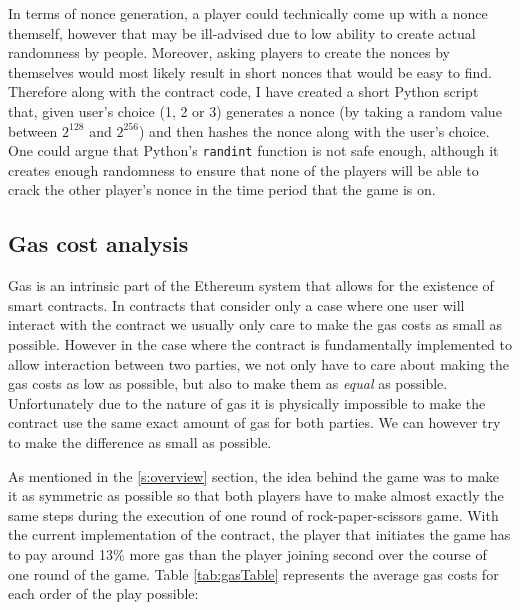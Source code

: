 \documentclass{article}
\begin{document}
    \noindent In terms of nonce generation, a player could
    technically come up with a nonce themself, however that
    may be ill-advised due to low ability to create actual
    randomness by people. Moreover, asking players to create
    the nonces by themselves would most likely result in
    short nonces that would be easy to find. Therefore along
    with the contract code, I have created a short Python
    script that, given user's choice (1, 2 or 3) generates a
    nonce (by taking a random value between \(2^{128}\) and
    \(2^{256}\)) and then hashes the nonce along with the
    user's choice. One could argue that Python's
    \verb|randint| function is not safe enough, although it
    creates enough randomness to ensure that none of the
    players will be able to crack the other player's nonce
    in the time period that the game is on.

    \subsection{Gas cost analysis}
    Gas is an intrinsic part of the Ethereum system that
    allows for the existence of smart contracts. In
    contracts that consider only a case where one user will
    interact with the contract we usually only care to make
    the gas costs as small as possible. However in the case
    where the contract is fundamentally implemented to allow
    interaction between two parties, we not only have to
    care about making the gas costs as low as possible, but
    also to make them as {\itshape equal} as possible.
    Unfortunately due to the nature of gas it is physically
    impossible to make the contract use the same exact
    amount of gas for both parties. We can however try to
    make the difference as small as possible.
    \newline

    \noindent As mentioned in the \ref{s:overview} section,
    the idea behind the game was to make it as symmetric as
    possible so that both players have to make almost
    exactly the same steps during the execution of one round
    of rock-paper-scissors game. With the current
    implementation of the contract, the player that
    initiates the game has to pay around 13\% more gas than
    the player joining second over the course of one round
    of the game. Table \ref{tab:gasTable} represents the
    average gas costs for each order of the play possible:
    \newline
\end{document}
